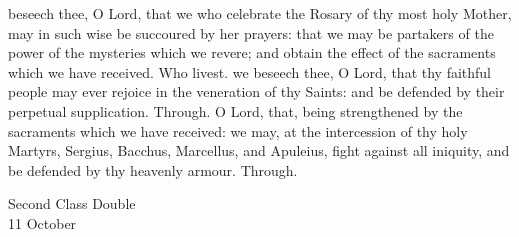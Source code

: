 
\postcommunion
{} beseech thee, O Lord, that we who celebrate the Rosary of thy most holy Mother, may in such wise be succoured by her prayers: that we may be partakers of the power of the mysteries which we revere; and obtain the effect of the sacraments which we have received. Who livest.
 we beseech thee, O Lord, that thy faithful people may ever rejoice in the veneration of thy Saints: and be defended by their perpetual supplication. Through.
 O Lord, that, being strengthened by the sacraments which we have received: we may, at the intercession of thy holy Martyrs, Sergius, Bacchus, Marcellus, and Apuleius, fight against all iniquity, and be defended by thy heavenly armour. Through.


\begin{inhead}
    {Second Class Double\\
11 October}
\end{inhead}

